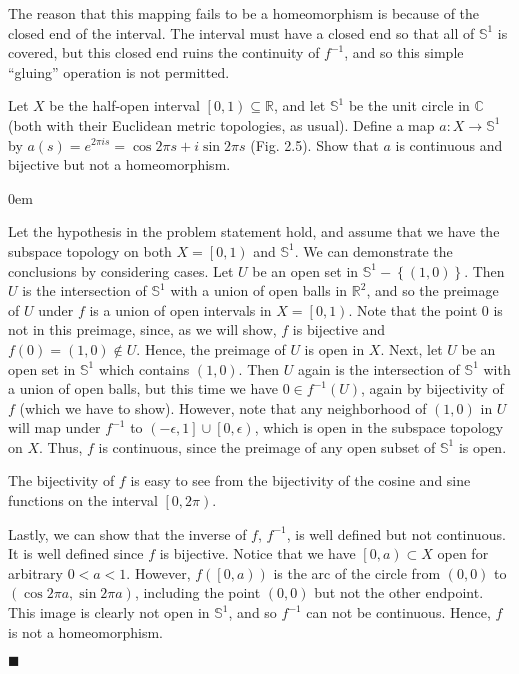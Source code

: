 \documentclass[12pt]{article}
\renewcommand{\qed}{\hfill$\blacksquare$}
\renewenvironment{proof}{\begin{addmargin}[1em]{0em}\begin{newproof}}{\end{newproof}\end{addmargin}\qed}
\newenvironment{exercise}[2][Exercise]{\begin{trivlist}
\item[\hskip \labelsep {\bfseries #1}\hskip \labelsep {\bfseries #2.}]}{\end{trivlist}}
\begin{document}
The reason that this mapping fails to be a homeomorphism is because of the closed end of the interval. The interval must have a closed end so that all of $\mathbb{S}^1$ is covered, but this closed end ruins the continuity of $f^{-1}$, and so this simple ``gluing'' operation is not permitted.\\

\begin{exercise}{2.28}
Let $X$ be the half-open interval $\left[0,1\right) \subseteq \mathbb{R}$, and let $\mathbb{S}^1$ be the unit circle in $\mathbb{C}$ (both with their Euclidean metric topologies, as usual). Define a map $a:X\rightarrow \mathbb{S}^1$ by $a\left(s\right)=e^{2\pi i s} = \cos 2\pi s + i \sin 2\pi s$ (Fig. 2.5). Show that $a$ is continuous and bijective but not a homeomorphism.
\end{exercise}
\begin{proof}
Let the hypothesis in the problem statement hold, and assume that we have the subspace topology on both $X=\left[0,1\right)$ and $\mathbb{S}^1$. We can demonstrate the conclusions by considering cases. Let $U$ be an open set in $\mathbb{S}^1-\left\{\left(1,0\right)\right\}$. Then $U$ is the intersection of $\mathbb{S}^1$ with a union of open balls in $\mathbb{R}^2$, and so the preimage of $U$ under $f$ is a union of open intervals in $X=\left[0,1\right)$. Note that the point $0$ is not in this preimage, since, as we will show, $f$ is bijective and $f\left(0\right) = \left(1,0\right) \notin U$. Hence, the preimage of $U$ is open in $X$. Next, let $U$ be an open set in $\mathbb{S}^1$ which contains $\left(1,0\right)$. Then $U$ again is the intersection of $\mathbb{S}^1$ with a union of open balls, but this time we have $0 \in f^{-1}\left(U\right)$, again by bijectivity of $f$ (which we have to show). However, note that any neighborhood of $\left(1,0\right)$ in $U$ will map under $f^{-1}$ to $\left(-\epsilon,1\right]\cup \left[0,\epsilon\right)$, which is open in the subspace topology on $X$. Thus, $f$ is continuous, since the preimage of any open subset of $\mathbb{S}^1$ is open.

The bijectivity of $f$ is easy to see from the bijectivity of the cosine and sine functions on the interval $\left[0,2\pi\right)$.

Lastly, we can show that the inverse of $f$, $f^{-1}$, is well defined but not continuous. It is well defined since $f$ is bijective. Notice that we have $\left[0,a\right) \subset X$ open for arbitrary $0<a<1$. However, $f\left(\left[0,a\right)\right)$ is the arc of the circle from $\left(0,0\right)$ to $\left(\cos 2\pi a, \sin 2\pi a\right)$, including the point $\left(0,0\right)$ but not the other endpoint. This image is clearly not open in $\mathbb{S}^1$, and so $f^{-1}$ can not be continuous. Hence, $f$ is not a homeomorphism.
\end{proof}
\end{document}
